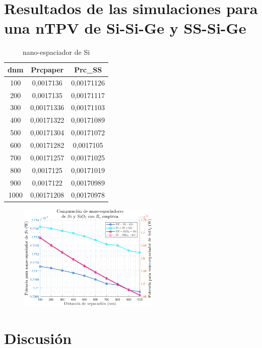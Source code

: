 \section{Resultados de las simulaciones para una nTPV de Si-Si-Ge y SS-Si-Ge}
\begin{table}[H]
	\centering
		\begin{tabular}{|c|c|c|}
		\hline
		dnm&Prcpaper&Prc\_SS\\ \hline 
		100&0,0017136&0,00171126\\ \hline 
		200&0,0017135&0,00171117\\ \hline 
		300&0,00171336&0,00171103\\ \hline 
		400&0,00171322&0,00171089\\ \hline 
		500&0,00171304&0,00171072\\ \hline 
		600&0,00171282&0,0017105\\ \hline 
		700&0,00171257&0,00171025\\ \hline 
		800&0,0017125&0,00171019\\ \hline 
		900&0,0017122&0,00170989\\ \hline 
		1000&0,00171208&0,00170978\\ \hline
		\end{tabular}
	\caption{nano-espaciador de Si}
	\label{tab:nanoEspaciadorDeSi}
\end{table}
\begin{figure}[H]
	\centering
		\includegraphics[width=0.6\textwidth]{figuras/Resultados/conduccion/relaciones_SiySiO2.png}
	\caption{ }
	\label{fig:relaciones_SiySiO2}
\end{figure}

\section{Discusión}